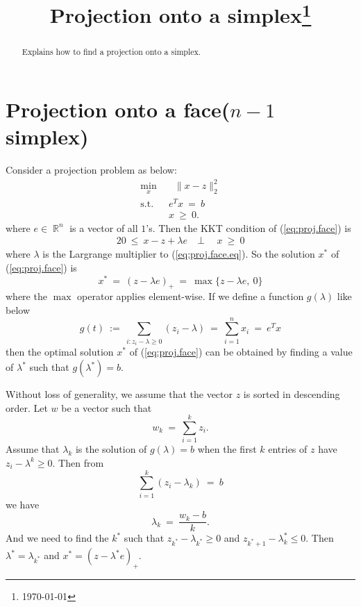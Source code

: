 \documentclass{siamltex}
\title{Projection onto a simplex\footnote{\today}}
\author{ }
\newcommand*{\beq}{\begin{equation}}
\newcommand*{\eeq}{\end{equation}}
\newcommand*{\bseq}{\begin{subequations}}
\newcommand*{\eseq}{\end{subequations}}
\newcommand*{\eqnok}[1]{(\ref{#1})}
\DeclareMathOperator*{\st}{\text{s.t.}}
\DeclareMathOperator*{\half}{\frac{1}{2}}
\DeclareMathOperator*{\bR}{{\mathbb R}}
\begin{document}
\maketitle

\begin{abstract} Explains how to find a projection onto a simplex.
\end{abstract}
%
%

\section{Projection onto a face($n-1$ simplex)}\label{sec:proj.face}
Consider a projection problem as below:
\bseq\begin{alignat}{2}\label{eq:proj.face}
 \min_{x} &~~ \half\|x-z\|_2^2 \\
 \st      &~~ e^T x ~=~ b \label{eq:proj.face.eq}\\
          &~~ x ~\ge~ 0.
\end{alignat}\eseq
where $e\in\bR^n$ is a vector of all $1$'s.
Then the KKT condition of \eqnok{eq:proj.face} is
\begin{alignat}{2}
 0 ~\le~ x-z+\lambda e & ~\perp~ &~ x ~\ge~ 0
\end{alignat}
where $\lambda$ is the Largrange multiplier to \eqnok{eq:proj.face.eq}. 
So the solution $x^*$ of \eqnok{eq:proj.face} is
\beq
 x^* ~=~ (z-\lambda e)_+ ~=~ \max\{z-\lambda e,~ 0\} 
\eeq
where the $\max$ operator applies element-wise. If we define a function $g(\lambda)$ like below 
\beq
 g(t) ~:=~ \sum_{i:z_i-\lambda\ge0} (z_i-\lambda) ~=~ \sum_{i=1}^n x_i ~=~ e^Tx
\eeq
then the optimal solution $x^*$ of \eqnok{eq:proj.face} can be obtained by finding a value of $\lambda^*$ such that $g(\lambda^*)=b$.

Without loss of generality, we assume that the vector $z$ is sorted in descending order. Let $w$ be a vector such that
\beq
 w_k ~=~ \sum_{i=1}^k z_i.
\eeq
Assume that $\lambda_k$ is the solution of $g(\lambda)=b$ when the first $k$ entries of $z$ have $z_i-\lambda^k\ge0$. Then from 
\beq
 \sum_{i=1}^k(z_i-\lambda_k) ~=~ b
\eeq
we have
\beq
 \lambda_k ~=~ \frac{w_k-b}{k}.
\eeq
And we need to find the $k^*$ such that $z_{k^*}-\lambda_{k^*}\ge0$ and $z_{k^*+1}-\lambda_k^*\le0$. Then $\lambda^*=\lambda_{k^*}$ and $x^*=(z-\lambda^*e)_+$.
\end{document}
